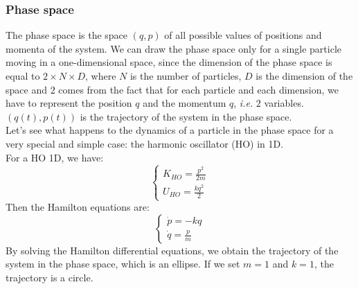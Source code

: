     \subsubsection{Phase space}
    The phase space is the space $(q,p)$ of all possible values of positions and momenta of the system. We can draw the phase space only for a single particle moving in a one-dimensional space, since the dimension of the phase space is equal to $2 \times N \times D$, where $N$ is the number of particles, $D$ is the dimension of the space and $2$ comes from the fact that for each particle and each dimension, we have to represent the position $q$ and the momentum $q$, \textit{i.e.} $2$ variables.
    \\$(q(t),p(t))$ is the trajectory of the system in the phase space.
    \\ Let's see what happens to the dynamics of a particle in the phase space for a very special and simple case: the harmonic oscillator (HO) in 1D.
    \\ For a HO 1D, we have:
    \begin{equation}
        \begin{cases}
            K_{HO}=\frac{p^2}{2m}\\
            U_{HO}=\frac{k q^2}{2}
        \end{cases}
    \end{equation}
    Then the Hamilton equations are:
    \begin{equation}
        \begin{cases}
            \dot{p}=-kq\\
            \dot{q}=\frac{p}{m}
        \end{cases}
    \end{equation}
    By solving the Hamilton differential equations, we obtain the trajectory of the system in the phase space, which is an ellipse. If we set $m=1$ and $k=1$, the trajectory is a circle.
    
